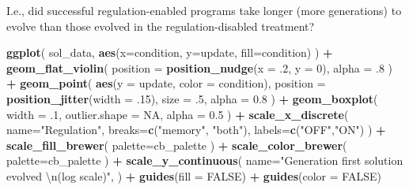 \documentclass[]{book}
\newenvironment{Shaded}{\begin{snugshade}}{\end{snugshade}}
\newcommand{\CharTok}[1]{\textcolor[rgb]{0.31,0.60,0.02}{#1}}
\newcommand{\DataTypeTok}[1]{\textcolor[rgb]{0.13,0.29,0.53}{#1}}
\newcommand{\DecValTok}[1]{\textcolor[rgb]{0.00,0.00,0.81}{#1}}
\newcommand{\FloatTok}[1]{\textcolor[rgb]{0.00,0.00,0.81}{#1}}
\newcommand{\KeywordTok}[1]{\textcolor[rgb]{0.13,0.29,0.53}{\textbf{#1}}}
\newcommand{\NormalTok}[1]{#1}
\newcommand{\OperatorTok}[1]{\textcolor[rgb]{0.81,0.36,0.00}{\textbf{#1}}}
\newcommand{\OtherTok}[1]{\textcolor[rgb]{0.56,0.35,0.01}{#1}}
\newcommand{\StringTok}[1]{\textcolor[rgb]{0.31,0.60,0.02}{#1}}
\begin{document}
I.e., did successful regulation-enabled programs take longer (more generations) to evolve than those evolved in the regulation-disabled treatment?

\begin{Shaded}
\begin{Highlighting}[]
\KeywordTok{ggplot}\NormalTok{( sol_data, }\KeywordTok{aes}\NormalTok{(}\DataTypeTok{x=}\NormalTok{condition, }\DataTypeTok{y=}\NormalTok{update, }\DataTypeTok{fill=}\NormalTok{condition) ) }\OperatorTok{+}
\StringTok{  }\KeywordTok{geom_flat_violin}\NormalTok{(}
    \DataTypeTok{position =} \KeywordTok{position_nudge}\NormalTok{(}\DataTypeTok{x =} \FloatTok{.2}\NormalTok{, }\DataTypeTok{y =} \DecValTok{0}\NormalTok{),}
    \DataTypeTok{alpha =} \FloatTok{.8}
\NormalTok{  ) }\OperatorTok{+}
\StringTok{  }\KeywordTok{geom_point}\NormalTok{(}
    \KeywordTok{aes}\NormalTok{(}\DataTypeTok{y =}\NormalTok{ update, }\DataTypeTok{color =}\NormalTok{ condition),}
    \DataTypeTok{position =} \KeywordTok{position_jitter}\NormalTok{(}\DataTypeTok{width =} \FloatTok{.15}\NormalTok{),}
    \DataTypeTok{size =} \FloatTok{.5}\NormalTok{,}
    \DataTypeTok{alpha =} \FloatTok{0.8}
\NormalTok{  ) }\OperatorTok{+}
\StringTok{  }\KeywordTok{geom_boxplot}\NormalTok{(}
    \DataTypeTok{width =} \FloatTok{.1}\NormalTok{,}
    \DataTypeTok{outlier.shape =} \OtherTok{NA}\NormalTok{,}
    \DataTypeTok{alpha =} \FloatTok{0.5}
\NormalTok{  ) }\OperatorTok{+}
\StringTok{  }\KeywordTok{scale_x_discrete}\NormalTok{(}
    \DataTypeTok{name=}\StringTok{"Regulation"}\NormalTok{,}
    \DataTypeTok{breaks=}\KeywordTok{c}\NormalTok{(}\StringTok{"memory"}\NormalTok{, }\StringTok{"both"}\NormalTok{),}
    \DataTypeTok{labels=}\KeywordTok{c}\NormalTok{(}\StringTok{"OFF"}\NormalTok{,}\StringTok{"ON"}\NormalTok{)}
\NormalTok{  ) }\OperatorTok{+}
\StringTok{  }\KeywordTok{scale_fill_brewer}\NormalTok{(}
    \DataTypeTok{palette=}\NormalTok{cb_palette}
\NormalTok{  ) }\OperatorTok{+}
\StringTok{  }\KeywordTok{scale_color_brewer}\NormalTok{(}
    \DataTypeTok{palette=}\NormalTok{cb_palette}
\NormalTok{  ) }\OperatorTok{+}
\StringTok{  }\KeywordTok{scale_y_continuous}\NormalTok{(}
    \DataTypeTok{name=}\StringTok{"Generation first solution evolved }\CharTok{\textbackslash{}n}\StringTok{(log scale)"}\NormalTok{,}
\NormalTok{  ) }\OperatorTok{+}
\StringTok{  }\KeywordTok{guides}\NormalTok{(}\DataTypeTok{fill =} \OtherTok{FALSE}\NormalTok{) }\OperatorTok{+}
\StringTok{  }\KeywordTok{guides}\NormalTok{(}\DataTypeTok{color =} \OtherTok{FALSE}\NormalTok{)}
\end{Highlighting}
\end{Shaded}
\end{document}
